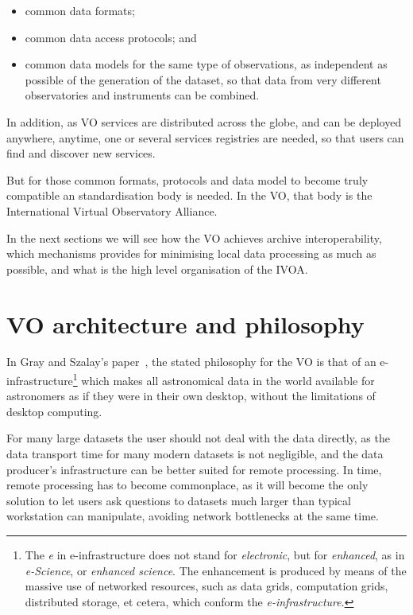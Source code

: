 	\begin{itemize}
		\item common data formats;
		
		 \item common data access protocols; and
		
		 \item common data models for the same type of
		observations, as independent as possible of the generation
		of the dataset, so that data from very different
		observatories and instruments can be combined.
	\end{itemize}
	
	 In addition, as VO services are distributed across the globe,
	and can be deployed anywhere, anytime, one or several services
	registries are needed, so that users can find and discover new
	services.
	
	 But for those common formats, protocols and data model to
	become truly compatible an standardisation body is needed. In
	the VO, that body is the International Virtual Observatory
	Alliance.
	
	 In the next sections we will see how the VO achieves archive
	interoperability, which mechanisms provides for minimising
	local data processing as much as possible, and what is the high
	level organisation of the IVOA.


\section{VO architecture and philosophy} %
\label{sec:vo_architecture}

	In Gray and Szalay's paper~\cite{2001Sci...293.2037S}, the
	stated philosophy for the VO is that of an
	e-infrastructure\footnote{The \emph{e} in e-infrastructure does
	not stand for \emph{electronic}, but for \emph{enhanced}, as in
	\emph{e-Science}, or \emph{enhanced science}. The enhancement
	is produced by means of the massive use of networked resources,
	such as data grids, computation grids, distributed storage, et
	cetera, which conform the \emph{e-infrastructure}.} which makes
	all astronomical data in the world available for astronomers as
	if they were in their own desktop, without the limitations of
	desktop computing.
	
	 For many large datasets the user should not deal with the data
	directly, as the data transport time for many modern datasets
	is not negligible, and the data producer's infrastructure can
	be better suited for remote processing. In time, remote
	processing has to become commonplace, as it will become the
	only solution to let users ask questions to datasets much
	larger than typical workstation can manipulate, avoiding
	network bottlenecks at the same time.
	
